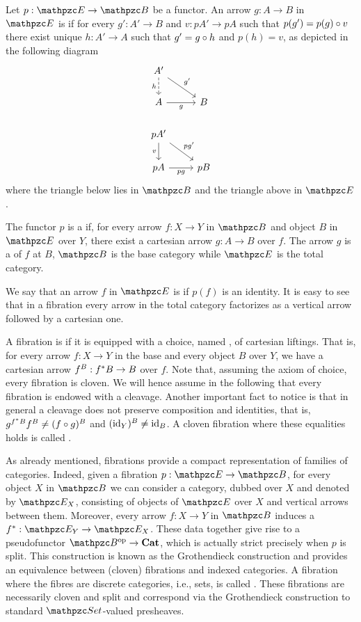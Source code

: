 \documentclass{lmcs} %
\theoremstyle{plain}\newtheorem{satz}[thm]{Satz} %
\begin{document}
				Let $p:\ct{E}\to\ct{B}$ be a functor. An arrow $g:A\to B$ in $\ct{E}$ is  if
				for every $g':A'\to B$ and $v:pA'\to pA$ such that $p(g')=p(g)\circ v$ there exist unique $h:A'\to A$ such that $g'=g\circ h$ and $p(h)=v$, as depicted in the following diagram
				\[\begin{tikzcd}
					{A'} \\
					A & B \\
					{pA'} \\
					pA & pB
					\arrow["h"', dashed, from=1-1, to=2-1]
					\arrow["{g'}", from=1-1, to=2-2]
					\arrow["g"', from=2-1, to=2-2]
					\arrow["v"', from=3-1, to=4-1]
					\arrow["{pg'}", from=3-1, to=4-2]
					\arrow["pg"', from=4-1, to=4-2]
				\end{tikzcd}\]
where the triangle below lies in $\ct{B}$ and the triangle above in $\ct{E}$.

				The functor $p$ is a    if, for every arrow $f:X\rightarrow Y$ in $\ct{B}$ and object $B$ in $\ct{E}$ over $Y$, there exist a  cartesian arrow $g:A\rightarrow B$ over $f$. 
				The arrow $g$ is a  of $f$ at $B$, $\ct{B}$ is the base category while $\ct{E}$ is the total category. 

We say that an arrow $f$ in $\ct{E}$ is  if $p(f)$ is an identity. 
It is easy to see that in a fibration  every arrow in the total category factorizes as a vertical arrow followed by a cartesian one. 
			
				A fibration is  if it is equipped with a choice, named , of cartesian liftings. 
That is, for every arrow $f:X\rightarrow Y$ in the base  and every object $B$ over $Y$, we have a cartesian arrow $f^{B}:f^*{B}\to B$ over $f$. 
Note that, assuming the axiom of choice, every fibration is cloven. We will hence assume in the following that every fibration is endowed with a cleavage.
% 
Another important fact to notice is that in general a cleavage does not preserve composition and identities, that is, 
$g^{f^*B}f^{B}\neq (f\circ g)^{B}$ and $(\mathrm{id}_{Y})^{B}\neq \mathrm{id}_{B}$.
A cloven fibration where these equalities holds is called . 

As already mentioned, fibrations provide a compact representation of families of categories. 
Indeed, given a fibration $p : \ct{E}\to\ct{B}$, for every object $X$ in $\ct{B}$ we can consider a category, dubbed  over $X$ and denoted by $\fibre{\ct{E}}{X}$, consisting of objects of $\ct{E}$ over $X$ and vertical arrows between them. 
Moreover, every arrow $f:X\to Y$ in $\ct{B}$ induces a  $\reind{f} : \fibre{\ct{E}}{Y}\to\fibre{\ct{E}}{X}$. 
These data together give rise to a pseudofunctor $\ct{B}\op\to\Cattwo$, which is actually strict precisely when $p$ is split. 
This construction is known as the Grothendieck construction  and provides an equivalence between (cloven) fibrations and indexed categories. 
A fibration where the fibres are discrete categories, i.e., sets, is called . 
These fibrations are necessarily cloven and split and correspond via the Grothendieck construction to standard $\ctset$-valued presheaves. 
\end{document}
